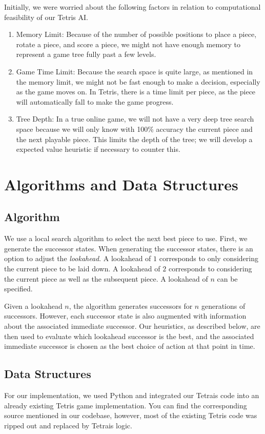 \documentclass[11pt]{article}
\begin{document}
Initially, we were worried about the following factors in relation to computational feasibility of our Tetris AI.
\begin{enumerate}
\item Memory Limit: Because of the number of possible positions to place a piece, rotate a piece, and score a piece, we might not have enough memory to represent a game tree fully past a few levels.
\item Game Time Limit: Because the search space is quite large, as mentioned in the memory limit, we might not be fast enough to make a decision, especially as the game moves on. In Tetris, there is a time limit per piece, as the piece will automatically fall to make the game progress.
\item Tree Depth: In a true online game, we will not have a very deep tree search space because we will only know with 100\% accuracy the current piece and the next playable piece. This limits the depth of the tree; we will develop a expected value heuristic if necessary to counter this.
\end{enumerate}


\section{Algorithms and Data Structures}
\subsection{Algorithm}
We use a local search algorithm to select the next best piece to use. First, we generate the successor states. When generating the successor states, there is an option to adjust the \textit{lookahead}. A lookahead of $1$ corresponds to only considering the current piece to be laid down. A lookahead of $2$ corresponds to considering the current piece as well as the subsequent piece. A lookahead of $n$ can be specified.

Given a lookahead $n$, the algorithm generates successors for $n$ generations of successors. However, each successor state is also augmented with information about the associated immediate successor. Our heuristics, as described below, are then used to evaluate which lookahead successor is the best, and the associated immediate successor is chosen as the best choice of action at that point in time.

\subsection{Data Structures}
For our implementation, we used Python and integrated our Tetrais code into an already existing Tetris game implementation. You can find the corresponding source mentioned in our codebase, however, most of the existing Tetris code was ripped out and replaced by Tetrais logic. 
\end{document}
